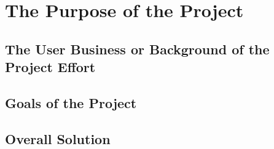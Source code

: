 \chapter{The Purpose of the Project}

\section{The User Business or Background of the Project Effort}

\section{Goals of the Project}

\section{Overall Solution}